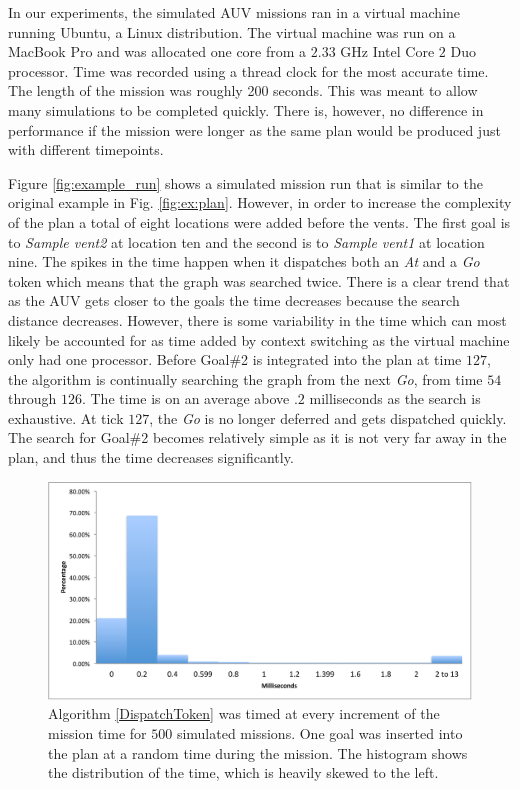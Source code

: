 In our experiments, the simulated AUV missions ran in a virtual
machine running Ubuntu, a Linux distribution. The virtual machine was
run on a MacBook Pro and was allocated one core from
a $2.33$ GHz Intel Core $2$ Duo processor. Time was
recorded using a thread clock for the most accurate time. The length of
the mission was roughly 200 seconds. This was meant to allow many
simulations to be completed quickly. There is, however, no difference in 
performance if the mission were longer as the same plan would be produced
just with different timepoints.

Figure \ref{fig:example_run} shows a simulated mission run that
is similar to the original example in Fig. \ref{fig:ex:plan}.
However, in order to increase the complexity of the plan a
total of eight locations were added before the vents. The first goal is to
{\em Sample vent2} at location ten and the second is to {\em Sample
  vent1} at location nine. The spikes in the time happen when it
dispatches both an {\em At} and a {\em Go} token which means that the graph
was searched twice. There is a clear trend that as the AUV gets
closer to the goals the time decreases because the search distance
decreases.  However, there is some variability in the time which can
most likely be accounted for as time added by context switching as the
virtual machine only had one processor. Before Goal\#2 is integrated
into the plan at time $127$, the algorithm is continually searching the
graph from the next {\em Go}, from time $54$ through $126$. The time is on an average above $.2$
milliseconds as the search is exhaustive. At tick $127$, the {\em Go} is no longer deferred and gets
dispatched quickly. The search for Goal\#2 becomes relatively simple as it is
not very far away in the plan, and thus the time decreases
significantly.

\begin{figure}[!htbp]
  \centering
  \includegraphics[width=\columnwidth]{figs/HistogramAlg1}
  \caption{\small Algorithm \ref{DispatchToken} was 
  timed at every increment of the mission time for $500$ 
  simulated missions. One goal was inserted into the plan 
  at a random time during the mission. The histogram shows 
  the distribution of the time, which is heavily skewed to the left.}
  \label{fig:histogram}
\end{figure}

